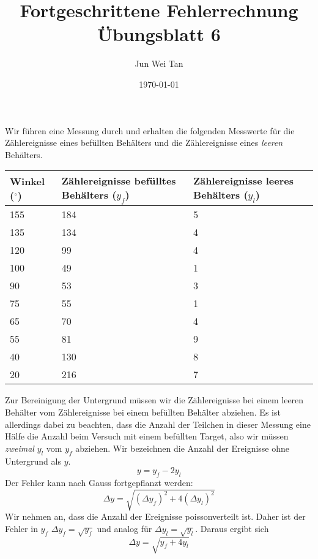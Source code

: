 \documentclass[prb,12pt]{revtex4-2}
\theoremstyle{definition}
\theoremstyle{definition}
\begin{document}
\title{Fortgeschrittene Fehlerrechnung Übungsblatt 6}
	\author{Jun Wei Tan}
	\date{\today}
	\maketitle

Wir führen eine Messung durch und erhalten die folgenden Messwerte für die Zählereignisse eines befüllten Behälters und die Zählereignisse eines \emph{leeren} Behälters.

\setlength{\tabcolsep}{12pt}

\begin{center}
	\begin{tabular}{p{3cm}p{5cm}p{5cm}}
		\toprule
		\textbf{Winkel ($^\circ$)} & \textbf{Zählereignisse befülltes Behälters ($y_f$)} & \textbf{Zählereignisse leeres Behälters ($y_l$)}\\\midrule
		 155 & 184 & 5 \\\midrule
		135 & 134 & 4 \\\midrule
		120 & 99 & 4 \\\midrule
		100 & 49 & 1 \\\midrule
		90 & 53 & 3 \\\midrule
		75 & 55 & 1 \\\midrule
		65 & 70 & 4 \\\midrule
		55 & 81 & 9 \\\midrule
		40 & 130 & 8 \\\midrule
		20 & 216 & 7 \\\bottomrule
	\end{tabular}
\end{center}

Zur Bereinigung der Untergrund müssen wir die Zählereignisse bei einem leeren Behälter vom Zählereignisse bei einem befüllten Behälter abziehen. Es ist allerdings dabei zu beachten, dass die Anzahl der Teilchen in dieser Messung eine Hälfe die Anzahl beim Versuch mit einem befüllten Target, also wir müssen \emph{zweimal} $y_l$ vom $y_f$ abziehen. Wir bezeichnen die Anzahl der Ereignisse ohne Untergrund als $y$.
\begin{equation}
	y=y_f-2y_l
\end{equation}
Der Fehler kann nach Gauss fortgepflanzt werden:
\[\Delta y = \sqrt{(\Delta y_f)^2 + 4(\Delta y_l)^2}\]
	Wir nehmen an, dass die Anzahl der Ereignisse poissonverteilt ist. Daher ist der Fehler in $y_f$ $\Delta y_f=\sqrt{y_f}$ und analog f\"{u}r $\Delta y_l=\sqrt{y_l}$. Daraus ergibt sich
	\begin{equation}
		\Delta y = \sqrt{y_f+4 y_l}
	\end{equation}
\end{document}
